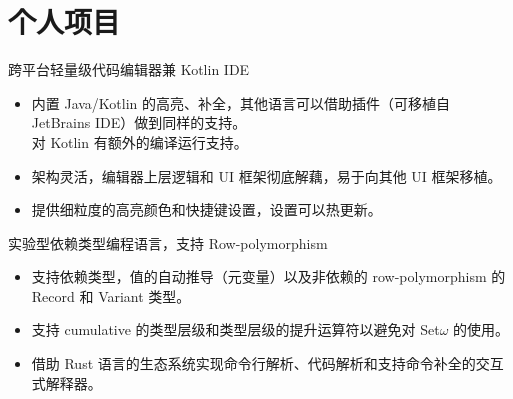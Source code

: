 \documentclass{resume}
\begin{document}
\section{个人项目}

跨平台轻量级代码编辑器兼 Kotlin IDE
\begin{itemize}
  \item 内置 Java/Kotlin 的高亮、补全，其他语言可以借助插件（可移植自 JetBrains IDE）做到同样的支持。 \\
    对 Kotlin 有额外的编译运行支持。
  \item 架构灵活，编辑器上层逻辑和 UI 框架彻底解藕，易于向其他 UI 框架移植。
  \item 提供细粒度的高亮颜色和快捷键设置，设置可以热更新。
\end{itemize}

实验型依赖类型编程语言，支持 Row-polymorphism
\begin{itemize}
  \item 支持依赖类型，值的自动推导（元变量）以及非依赖的 row-polymorphism 的 Record 和 Variant 类型。
  \item 支持 cumulative 的类型层级和类型层级的提升运算符以避免对 Set$\omega$ 的使用。
  \item 借助 Rust 语言的生态系统实现命令行解析、代码解析和支持命令补全的交互式解释器。
\end{itemize}

\end{document}
